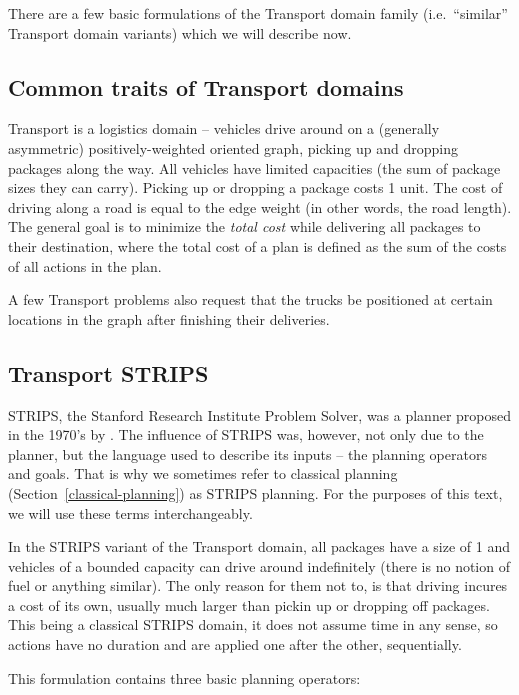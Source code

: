 There are a few basic formulations of the Transport domain family (i.e.~``similar'' Transport domain variants) which we will describe now.

\subsection{Common traits of Transport domains}

Transport is a logistics domain -- vehicles drive around on a (generally asymmetric) positively-weighted oriented graph, picking up and dropping packages along the way.
All vehicles have limited capacities (the sum of package sizes they can carry).
Picking up or dropping a package costs 1 unit. The cost of driving along a road is equal to the edge weight
(in other words, the road length).
The general goal is to minimize the \textit{total cost}
while delivering all packages to their destination, where
the total cost of a plan is defined as the sum of the costs of all actions in
the plan.

A few Transport problems also request that the trucks be positioned at certain
locations in the graph
after finishing their deliveries.

\subsection{Transport STRIPS}\label{transport-strips}

STRIPS, the Stanford Research Institute Problem Solver,
was a planner proposed in the 1970's by \citet{Fikes1971}.
The influence of STRIPS was, however, not only due to the planner,
but the language used to describe its inputs -- the planning operators and goals.
That is why we sometimes refer to classical planning (Section~\ref{classical-planning})
as STRIPS planning. For the purposes of this text, we will use these terms interchangeably.

In the STRIPS variant of the Transport domain,
all packages have a size of 1 and vehicles of a bounded capacity can drive around indefinitely
(there is no notion of fuel or anything similar). The only reason for them not to, is that
driving incures a cost of its own, usually much larger than pickin up or dropping off packages.
This being a classical STRIPS domain,
it does not assume time in any sense,
so actions have no duration and are applied one after the other, sequentially.

This formulation contains three basic planning operators:

